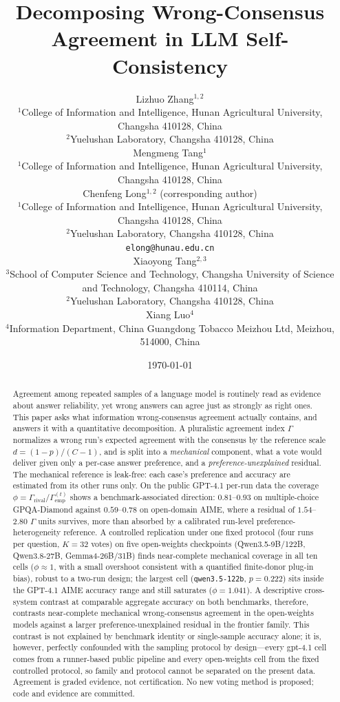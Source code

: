 \documentclass{article}
\title{Decomposing Wrong-Consensus Agreement in LLM Self-Consistency}
\author{Lizhuo Zhang$^{1,2}$ \\
  \small $^{1}$College of Information and Intelligence, Hunan Agricultural
  University, Changsha 410128, China \\
  \small $^{2}$Yuelushan Laboratory, Changsha 410128, China \\
  Mengmeng Tang$^{1}$ \\
  \small $^{1}$College of Information and Intelligence, Hunan Agricultural
  University, Changsha 410128, China \\
  Chenfeng Long$^{1,2}$ (corresponding author) \\
  \small $^{1}$College of Information and Intelligence, Hunan Agricultural
  University, Changsha 410128, China \\
  \small $^{2}$Yuelushan Laboratory, Changsha 410128, China \\
  \small \texttt{elong@hunau.edu.cn} \\
  Xiaoyong Tang$^{2,3}$ \\
  \small $^{3}$School of Computer Science and Technology, Changsha
  University of Science and Technology, Changsha 410114, China \\
  \small $^{2}$Yuelushan Laboratory, Changsha 410128, China \\
  Xiang Luo$^{4}$ \\
  \small $^{4}$Information Department, China Guangdong Tobacco Meizhou Ltd,
  Meizhou, 514000, China}
\date{\today}
\newcommand{\agreementIndex}{\Gamma}
\begin{document}
\maketitle

\begin{abstract}
Agreement among repeated samples of a language model is routinely read
as evidence about answer reliability, yet wrong answers can agree just
as strongly as right ones. This paper asks what information
wrong-consensus agreement actually contains, and answers it with a
quantitative decomposition. A pluralistic agreement index $\agreementIndex$
normalizes a wrong run's expected agreement with the consensus by the
reference scale $d=(1-p)/(C-1)$, and is split into a \emph{mechanical}
component, what a vote would deliver given only a per-case answer
preference, and a \emph{preference-unexplained} residual. The mechanical
reference is leak-free: each case's preference and accuracy are
estimated from its other runs only. On the public GPT-4.1 per-run data
the coverage $\phi=\agreementIndex_{\mathrm{rival}}/\agreementIndex_{\mathrm{emp}}^{(t)}$
shows a benchmark-associated direction: $0.81$--$0.93$ on multiple-choice
GPQA-Diamond against $0.59$--$0.78$ on open-domain AIME, where a
residual of $1.54$--$2.80$ $\agreementIndex$ units survives, more than absorbed by
a calibrated run-level preference-heterogeneity reference. A controlled
replication under one fixed protocol (four runs per question, $K=32$
votes) on five open-weights checkpoints
(Qwen3.5-9B/122B, Qwen3.8-27B, Gemma4-26B/31B) finds
near-complete mechanical coverage in all ten cells
($\phi\approx1$, with a small overshoot consistent with a quantified
finite-donor plug-in bias), robust to a two-run design; the largest cell
(\texttt{qwen3.5-122b}, $p=0.222$) sits inside the GPT-4.1 AIME
accuracy range and still saturates ($\phi=1.041$). A descriptive
cross-system contrast at comparable aggregate accuracy on both benchmarks,
therefore, contrasts near-complete mechanical wrong-consensus agreement in the
open-weights models against a larger preference-unexplained residual in the
frontier family. This contrast is not explained by benchmark identity or
single-sample accuracy alone; it is, however,
perfectly confounded with the sampling protocol by design---every gpt-4.1 cell comes from a runner-based public pipeline
and every open-weights cell from the fixed controlled protocol, so
family and protocol cannot be separated on the present data. Agreement is graded evidence, not certification. No new
voting method is proposed; code and evidence are committed.
\end{abstract}
\end{document}
